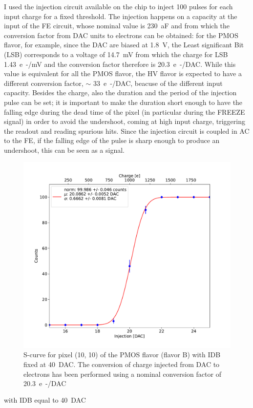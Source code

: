         I used the injection circuit available on the chip to inject 100 pulses for each input charge for a fixed threshold.
        The injection happens on a capacity at the input of the FE circuit, whose nominal value is \SI{230}{aF} and from which the conversion factor from DAC units to electrons can be obtained: for the PMOS flavor, for example, since the DAC are biased at \SI{1.8}{V}, the Least significant Bit (LSB) corresponds to a voltage of \SI{14.7}{mV} from which the charge for LSB \SI{1.43}{e-/mV} and the conversion factor therefore is \SI{20.3}{e-/DAC}.     
        While this value is equivalent for all the PMOS flavor, the HV flavor is expected to have a different conversion factor, $\sim$ \SI{33}{e-/DAC}, beacuse of the different input capacity. 
        Besides the charge, also the duration and the period of the injection pulse can be set; it is important to make the duration short enough to have the falling edge during the dead time of the pixel (in particular during the FREEZE signal) in order to avoid the undershoot, coming at high input charge, triggering the readout and reading spurious hits. 
        Since the injection circuit is coupled in AC to the FE, if the falling edge of the pulse is sharp enough to produce an undershoot, this can be seen as a signal. 

        \begin{figure}[h!]
            \centering
            \includegraphics[width=.6\linewidth]{figures/charaterization/scurve.pdf}
            \caption{S-curve for pixel (10, 10) of the PMOS flavor (flavor B) with IDB fixed at \SI{40}{DAC}. The conversion of charge injected from DAC to electrons has been performed using a nominal conversion factor of \SI{20.3}{e-/DAC} }
            \label{fig:scurve}
        \end{figure}   
        with IDB equal to \SI{40}{DAC}


